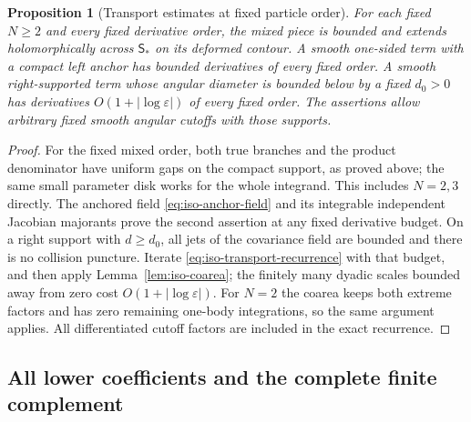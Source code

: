 \documentclass[11pt]{article}
\numberwithin{equation}{section}
\newtheorem{proposition}[theorem]{Proposition}
\theoremstyle{definition}
\newcommand{\eps}{\varepsilon}
\begin{document}
\begin{proposition}[Transport estimates at fixed particle order]
\label{prop:iso-finite-transport}
For each fixed $N\ge2$ and every fixed derivative order, the mixed
piece is bounded and extends holomorphically across
$\mathsf S_*$ on its deformed contour.  A smooth one-sided term with
a compact left anchor has bounded derivatives of every fixed order.
A smooth right-supported term whose angular diameter is bounded
below by a fixed $d_0>0$ has derivatives
$O(1+|\log\eps|)$ of every fixed order.  The assertions allow
arbitrary fixed smooth angular cutoffs with those supports.
\end{proposition}
\begin{proof}
For the fixed mixed order, both true branches and the product
denominator have uniform gaps on the compact support, as proved
above; the same small parameter disk works for the whole integrand.
This includes $N=2,3$ directly.  The anchored field
\eqref{eq:iso-anchor-field} and its integrable independent Jacobian
majorants prove the second assertion at any fixed derivative budget.
On a right support with $d\ge d_0$, all jets of the covariance
field are bounded and there is no collision puncture.  Iterate
\eqref{eq:iso-transport-recurrence} with that budget, and then apply
Lemma~\ref{lem:iso-coarea}; the finitely many dyadic scales bounded
away from zero cost $O(1+|\log\eps|)$.  For $N=2$ the coarea keeps
both extreme factors and has zero remaining one-body integrations,
so the same argument applies.  All differentiated cutoff factors
are included in the exact recurrence.
\end{proof}


\subsection{All lower coefficients and the complete finite complement}
\end{document}
